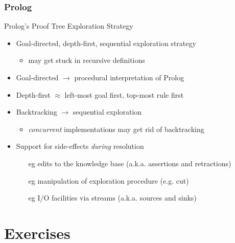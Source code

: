 \documentclass[presentation]{beamer}\mode<presentation>{\usetheme{AMSBolognaFC}}
\begin{document}
\subsubsection{Prolog}

\begin{frame}{Prolog's Proof Tree Exploration Strategy}
    \begin{itemize}
        \item Goal-directed, depth-first, sequential exploration strategy
        \begin{itemize}
            \item may get stuck in recursive definitions
        \end{itemize}

        \vfill

        \item Goal-directed $\rightarrow$ \alert{procedural} interpretation of Prolog
        
        \vfill

        \item Depth-first $\approx$ \alert{left-most} goal first, \alert{top-most} rule first
        
        \vfill

        \item \alert{Backtracking} $\rightarrow$ sequential exploration
        \begin{itemize}
            \item \emph{concurrent} implementations may get rid of backtracking
        \end{itemize}

        \vfill

        \item Support for \alert{side-effects} \emph{during} resolution
        \begin{itemize}
            \item[eg] edits to the knowledge base (a.k.a. assertions and retractions)
            \item[eg] manipulation of exploration procedure (e.g. cut)
            \item[eg] I/O facilities via streams (a.k.a. sources and sinks) 
        \end{itemize}
    \end{itemize}
\end{frame}

\section{Exercises}
\end{document}
